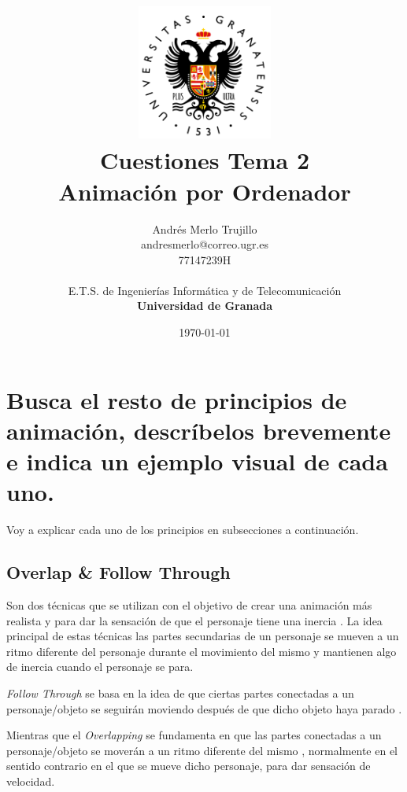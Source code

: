 \documentclass{article}
\title{
\includegraphics[width=1.75in]{imagenes/UGR-Logo.png} \\
\vspace*{1in}
\textbf{Cuestiones Tema 2} \\
Animación por Ordenador \\
\vspace*{0.5in}}
\author{Andrés Merlo Trujillo \\
andresmerlo@correo.ugr.es \\
77147239H \\ 
\vspace*{0.5in} \\
E.T.S. de Ingenierías Informática y de Telecomunicación \\
\textbf{Universidad de Granada}} \date{\today}
\begin{document}
\begin{titlingpage}
\maketitle
\end{titlingpage}

\tableofcontents

\newpage

\pagestyle{fancy}   %

\section{Busca el resto de principios de animación, descríbelos brevemente e indica un ejemplo visual de cada uno.}

Voy a explicar cada uno de los principios en subsecciones a continuación.

\subsection{Overlap \& Follow Through}

Son dos técnicas que se utilizan con el objetivo de crear una animación más realista y para dar la sensación de que el personaje tiene una inercia \cite{overlap}. La idea principal de estas técnicas las partes secundarias de un personaje se mueven a un ritmo diferente del personaje durante el movimiento del mismo y mantienen algo de inercia cuando el personaje se para.

\bigskip

\textit{Follow Through} se basa en la idea de que ciertas partes conectadas a un personaje/objeto se seguirán moviendo después de que dicho objeto haya parado \cite{overlap}.

\bigskip

Mientras que el \textit{Overlapping} se fundamenta en que las partes conectadas a un personaje/objeto se moverán a un ritmo diferente del mismo \cite{overlap}, normalmente en el sentido contrario en el que se mueve dicho personaje, para dar sensación de velocidad.
\end{document}
